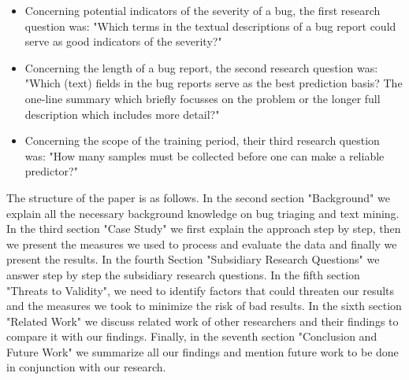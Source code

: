 \documentclass[sigconf,screen]{acmart}
\begin{document}
\begin{itemize}
\item Concerning potential indicators of the severity of a bug, the first research question was: "Which terms in the textual descriptions of a bug report could serve as good indicators of the severity?" \cite{ourPaper}

\item Concerning the length of a bug report, the second research question was: "Which (text) fields in the bug reports serve as the best prediction basis? The one-line summary which briefly focusses on the problem or the longer full description which includes more detail?" \cite{ourPaper}

\item Concerning the scope of the training period, their third research question was: "How many samples must be collected before one can make a reliable predictor?" \cite{ourPaper}
\end{itemize}

The structure of the paper is as follows. In the second section "Background" we explain all the necessary background knowledge on bug triaging and text mining. In the third section "Case Study" we first explain the approach step by step, then we present the measures we used to process and evaluate the data and finally we present the results. In the fourth Section "Subsidiary Research Questions" we answer step by step the subsidiary research questions. In the fifth section "Threats to Validity", we need to identify factors that could threaten our results and the measures we took to minimize the risk of bad results. In the sixth section "Related Work" we discuss related work of other researchers and their findings to compare it with our findings. Finally, in the seventh section "Conclusion and Future Work" we summarize all our findings and mention future work to be done in conjunction with our research.






\appendix
\end{document}
